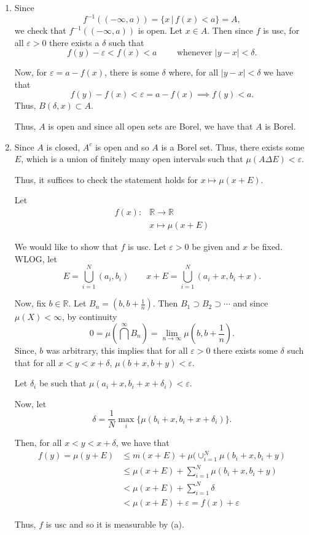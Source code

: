 \documentclass[12pt]{Homework}
\begin{document}
\begin{solution}$\,$
\begin{enumerate}[label=(\alph*)]
    \item Since $$f^{-1}((-\infty,a))=\{x\,|\,f(x)<a\}=A,$$ we check that $f^{-1}((-\infty,a))$ is open. Let $x\in A.$ Then since $f$ is usc, for all $\varepsilon>0$ there exists a $\delta$ such that $$f(y)-\varepsilon<f(x)<a\qquad\text{ whenever }|y-x|<\delta.$$
    
    Now, for $\varepsilon=a-f(x)$, there is some $\delta$ where, for all $|y-x|<\delta$ we have that $$f(y)-f(x)<\varepsilon=a-f(x)\implies f(y)<a.$$ Thus, $B(\delta,x)\subset A$.
    
    Thus, $A$ is open and since all open sets are Borel, we have that $A$ is Borel.
    \item Since $A$ is closed, $A^c$ is open and so $A$ is a Borel set. Thus, there exists some $E$, which is a union of finitely many open intervals such that $\mu(A\Delta E)<\varepsilon.$
    
    Thus, it suffices to check the statement holds for $x\mapsto\mu(x+E).$
    
    Let \begin{align*}
        f(x):&\mathbb{R}\to\mathbb{R}\\
        &x\mapsto\mu(x+E)
    \end{align*}
    
    We would like to show that $f$ is usc. Let $\varepsilon>0$ be given and $x$ be fixed. WLOG, let $$E=\bigcup_{i=1}^N(a_i,b_i)\qquad x+E=\bigcup_{i=1}^N(a_i+x,b_i+x).$$
    
    Now, fix $b\in\mathbb{R}$. Let $B_n=(b,b+\frac{1}{n})$. Then $B_1\supset B_2\supset \cdots$ and since $\mu(X)<\infty$, by continuity $$0=\mu(\bigcap^\infty B_n)=\lim_{n\to\infty}\mu(b,b+\frac{1}{n}).$$ Since, $b$ was arbitrary, this implies that for all $\varepsilon>0$ there exists some $\delta$ such that for all $x<y<x+\delta$, $\mu(b+x,b+y)<\varepsilon$.
    
    Let $\delta_i$ be such that $\mu(a_i+x,b_i+x+\delta_i)<\varepsilon.$
    
    Now, let $$\delta=\frac{1}{N}\max_i\{\mu(b_i+x,b_i+x+\delta_i)\}.$$
    
    Then, for all $x<y<x+\delta$, we have that \begin{align*}
        f(y)=\mu(y+E)&\le m(x+E)+\mu(\cup_{i=1}^N\mu(b_i+x,b_i+y)\\
        &\le\mu(x+E)+\sum_{i=1}^N\mu(b_i+x,b_i+y)\\
        &<\mu(x+E)+\sum_{i=1}^N\delta\\
        &<\mu(x+E)+\varepsilon=f(x)+\varepsilon
    \end{align*}
    
    Thus, $f$ is usc and so it is measurable by (a).
 \end{enumerate}
\end{solution}
\newpage
\end{document}
